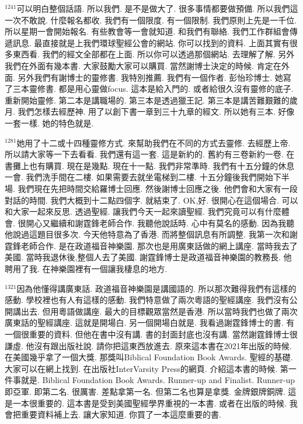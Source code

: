 \documentclass{book}
\begin{document}
$^{1241}$可以明白整個話語.
所以我們.
是不是做大了.
很多事情都要做預備.
所以我們這一次不敢說.
什麼報名都收.
我們有一個限度.
有一個限制.
我們原則上先是一千位.
所以星期一會開始報名.
有些教會等一會就知道.
和我們有聯絡.
我們工作群組會傳遞訊息.
最直接就是上我們環球聖經公會的網站.
你可以找到的資料.
上面其實有很多東西看.
我們的經文全部都在上面.
所以你可以透過那個網站.
去理解了解.
另外我們在外面有幾本書.
大家鼓勵大家可以購買.
當然謝博士決定的時候.
肯定在外面.
另外我們有謝博士的靈修書.
我特別推薦.
我們有一個作者.
彭怡珍博士.
她寫了三本靈修書.
都是用心靈做focus.
這本是給入門的.
或者給很久沒有靈修的底子.
重新開始靈修.
第二本是講職場的.
第三本是透過獵王記.
第三本是講苦難艱難的歲月.
我們怎樣去經歷神.
用了以創下書一章到三十九章的經文.
所以她有三本.
好像一套一樣.
她的特色就是.

$^{1281}$她用了十二或十四種靈修方式.
來幫助我們在不同的方式去靈修.
去經歷上帝.
所以請大家等一下去看看.
我們還有這一套.
這是新約的.
舊約有三卷新約一卷.
在書攤上也有購買.
現在是幾點.
現在十一點.
我們非常準時.
我們有十五分鐘的休息一會.
我們洗手間在二樓.
如果需要去就坐電梯到二樓.
十五分鐘後我們開始下半場.
我們現在先把時間交給羅博士回應.
然後謝博士回應之後.
他們會和大家有一段對話的時間.
我們大概到十二點四個字.
就結束了.
OK,好.
很開心在這個場合.
可以和大家一起來反思.
透過聖經.
讓我們今天一起來讀聖經.
我們究竟可以有什麼體會.
很開心又繼續和謝霆鋒老師合作.
我聽他說話時.
心中有莫名的感動.
因為我聽他說過這題目很多次.
今天他特意為了香港.
而將整個訊息有所調整.
我第一次和謝霆鋒老師合作.
是在政道福音神樂園.
那次也是用廣東話做的網上講座.
當時我去了美國.
當時我退休後,整個人去了美國.
謝霆鋒博士是政道福音神樂園的教務長.
他聘用了我.
在神樂園裡有一個讓我棲息的地方.

$^{1321}$因為他懂得講廣東話.
政道福音神樂園是講國語的.
所以那次難得我們有這樣的感動.
學校裡也有人有這樣的感動.
我們特意做了兩次粵語的聖經講座.
我們沒有公開講出去.
但用粵語做講座.
最大的目標觀眾當然是香港.
所以當時我們也做了兩次廣東話的聖經講座.
這就是開場白.
另一個開場白就是.
我看過謝霆鋒博士的書.
有一個很重要的資料.
但他在書中沒有講.
書的封面封底也沒有講.
當然謝霆鋒博士很謙虛.
他沒有跟出版社說.
請你把這東西放進去.
原來這本書在2021年出版的時候.
在美國幾乎拿了一個大獎.
那獎叫Biblical Foundation Book Awards.
聖經的基礎.
大家可以在網上找到.
在出版社InterVarsity Press的網頁.
介紹這本書的時候.
第一件事就是.
Biblical Foundation Book Awards.
Runner-up and Finalist.
Runner-up即亞軍.
即第二名.
很厲害.
差點拿第一名.
但第二名也算是拿獎.
金牌銀牌銅牌.
這是一本很重要的.
這本書是受到美國聖經學界重視的一本書.
或者在出版的時候.
我會把重要資料補上去.
讓大家知道.
你買了一本這麼重要的書.
\end{document}
